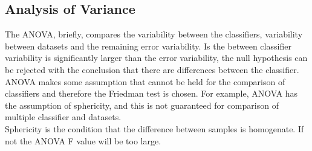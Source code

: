 \subsection{Analysis of Variance}
The ANOVA, briefly, compares the variability between the classifiers, variability between datasets and the remaining error variability. 
Is the between classifier variability is significantly larger than the error variability, the null hypothesis can be rejected with the conclusion that there are differences between the classifier.
\acs{ANOVA} makes some assumption that cannot be held for the comparison of classifiers and therefore the Friedman test is chosen.
For example, \acs{ANOVA} has the assumption of sphericity, and this is not guaranteed for comparison of multiple classifier and datasets.\cite[p. 10]{JanezDemsar.2006}\\
Sphericity is the condition that the difference between samples is homogenate. If not the \acs{ANOVA} F value will be too large.\cite[p. 152]{Hinton.2004}


